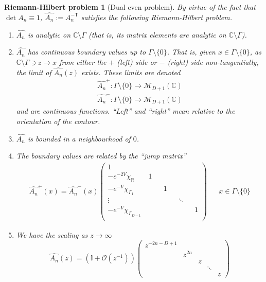 \documentclass[12pt]{article}
\newtheorem{rhp}[theorem]{Riemann-Hilbert problem}
\theoremstyle{definition}
\begin{document}
\begin{rhp}[Dual even problem] By virtue of the fact that $\det A_n \equiv 1$, $\widehat{A_n}:=A_n^{-\mathsf{T}}$ satisfies the following Riemann-Hilbert problem.
\begin{enumerate}
\item $\widehat{A_{n}}$ is analytic on $\mathbb{C}\setminus \Gamma$ (that is, its matrix elements are analytic on $\mathbb{C}\setminus \Gamma$). 
\item $\widehat{A_{n}}$ has continuous boundary values up to $\Gamma \setminus \{ 0 \}$. That is,  given $x \in \Gamma \setminus \{ 0 \}$,  as $\mathbb{C}\setminus \Gamma  \ni  z \to x$ from either the $+$ (left) side or $-$ (right) side non-tangentially,  the limit of $\widehat{A_{n}}(z)$ exists. These limits are denoted
\begin{align*}
\widehat{A_{n}}^+ : \Gamma \setminus \{ 0 \} \to \mathcal{M}_{D+1}(\mathbb{C}) \\
\widehat{A_{n}}^- : \Gamma \setminus \{ 0 \} \to \mathcal{M}_{D+1}(\mathbb{C})
\end{align*}
and are continuous functions.  \enquote{Left} and \enquote{right} mean relative to the orientation of the contour. 
\item $\widehat{A_{n}}$ is bounded in a neighbourhood of $0$. 
\item The boundary values are related by the \enquote{jump matrix}
\begin{align*}
\widehat{A_{n}}^{+}(x) = \widehat{A_{n}}^{-}(x)\left(
\begin{array}{ccccccccccccccccccc}
1 \,  & & &  \\
- e^{-2V} \chi_\mathbb{R}  & 1 \\
- e^{-V} \chi_{\Gamma_1}   & & & 1 \\
\vdots  & & & & &   \ddots \\
- e^{-V} \chi_{\Gamma_{D-1}}  \,  & & & & & &  &  1 \\
\end{array} \right) & & x \in \Gamma \setminus \{ 0 \}
\end{align*}
\item We have the scaling as $z \to \infty$
$$\widehat{A_{n}}(z) = \left(\mathbb{I}+ \mathcal{O}(z^{-1})\right) \left(\begin{matrix}
z^{-2n-D+1} \\
& z^{2n} \\
& & z \\
& & & \ddots  \\
& & & & z
\end{matrix} \right)$$
\end{enumerate}
\end{rhp}
\end{document}
